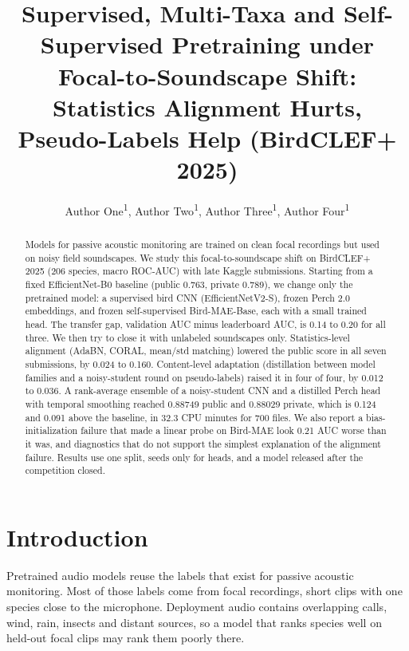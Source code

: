 \documentclass[letterpaper]{article} %
\title{Supervised, Multi-Taxa and Self-Supervised Pretraining under Focal-to-Soundscape Shift: Statistics Alignment Hurts, Pseudo-Labels Help (BirdCLEF+ 2025)}
\author{
    Author One\textsuperscript{\rm 1},
    Author Two\textsuperscript{\rm 1},
    Author Three\textsuperscript{\rm 1},
    Author Four\textsuperscript{\rm 1}
}
\begin{document}
\maketitle

\begin{abstract}
Models for passive acoustic monitoring are trained on clean focal recordings but used on noisy field soundscapes. We study this focal-to-soundscape shift on BirdCLEF+ 2025 (206 species, macro ROC-AUC) with late Kaggle submissions. Starting from a fixed EfficientNet-B0 baseline (public 0.763, private 0.789), we change only the pretrained model: a supervised bird CNN (EfficientNetV2-S), frozen Perch 2.0 embeddings, and frozen self-supervised Bird-MAE-Base, each with a small trained head. The transfer gap, validation AUC minus leaderboard AUC, is 0.14 to 0.20 for all three. We then try to close it with unlabeled soundscapes only. Statistics-level alignment (AdaBN, CORAL, mean/std matching) lowered the public score in all seven submissions, by 0.024 to 0.160. Content-level adaptation (distillation between model families and a noisy-student round on pseudo-labels) raised it in four of four, by 0.012 to 0.036. A rank-average ensemble of a noisy-student CNN and a distilled Perch head with temporal smoothing reached 0.88749 public and 0.88029 private, which is 0.124 and 0.091 above the baseline, in 32.3 CPU minutes for 700 files. We also report a bias-initialization failure that made a linear probe on Bird-MAE look 0.21 AUC worse than it was, and diagnostics that do not support the simplest explanation of the alignment failure. Results use one split, seeds only for heads, and a model released after the competition closed.
\end{abstract}

\section{Introduction}
Pretrained audio models reuse the labels that exist for passive acoustic monitoring. Most of those labels come from focal recordings, short clips with one species close to the microphone. Deployment audio contains overlapping calls, wind, rain, insects and distant sources, so a model that ranks species well on held-out focal clips may rank them poorly there.
\end{document}
